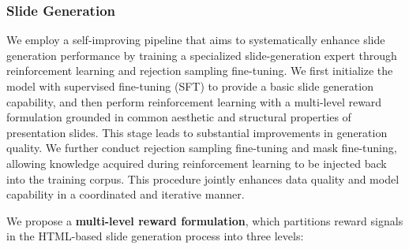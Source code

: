 




\subsubsection{Slide Generation}

We employ a self-improving pipeline that aims to systematically enhance slide generation performance by training a specialized slide-generation expert through reinforcement learning and rejection sampling fine-tuning. We first initialize the model with supervised fine-tuning (SFT) to provide a basic slide generation capability, and then perform reinforcement learning with a multi-level reward formulation grounded in common aesthetic and structural properties of presentation slides. This stage leads to substantial improvements in generation quality. We further conduct rejection sampling fine-tuning and mask fine-tuning, allowing knowledge acquired during reinforcement learning to be injected back into the training corpus. This procedure jointly enhances data quality and model capability in a coordinated and iterative manner.

We propose a \textbf{multi-level reward formulation}, which partitions reward signals in the HTML-based slide generation process into three levels:

